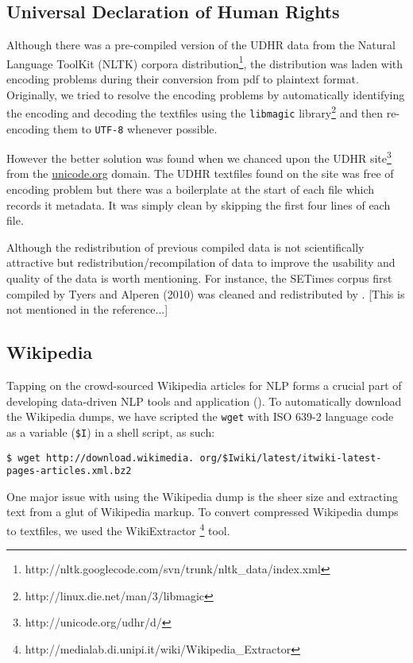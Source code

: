 \documentclass[11pt]{article}
\begin{document}
\subsection{Universal Declaration of Human Rights}

Although there was a pre-compiled version of the UDHR data from the Natural Language ToolKit (NLTK) corpora distribution\footnote{http://nltk.googlecode.com/svn/trunk/nltk\_data/index.xml}, the distribution was laden with encoding problems during their conversion from pdf to plaintext format. Originally, we tried to resolve the encoding problems by automatically identifying the encoding and decoding the textfiles using the \texttt{libmagic} library\footnote{http://linux.die.net/man/3/libmagic} and then re-encoding them to \texttt{UTF-8} whenever possible. 

However the better solution was found when we chanced upon the UDHR site\footnote{http://unicode.org/udhr/d/} from the \url{unicode.org} domain. The UDHR textfiles found on the site was free of encoding problem but there was a boilerplate at the start of each file which records it metadata. It was simply clean by skipping the first four lines of each file. 

Although the redistribution of previous compiled data is not scientifically attractive but redistribution/recompilation of data to improve the usability and quality of the data is worth mentioning. For instance, the SETimes corpus first compiled by Tyers and Alperen (2010) was cleaned and redistributed by . [This is not mentioned in the reference...]

\subsection{Wikipedia}

Tapping on the crowd-sourced Wikipedia articles for NLP forms a crucial part of developing data-driven NLP tools and application ({\color{red}{citation neeeded}}). To automatically download the Wikipedia dumps, we have scripted the \texttt{wget} with ISO 639-2 language code as a variable (\texttt{\$I}) in a shell script, as such:

\smallskip
\noindent \texttt{\$ wget http://download.wikimedia.
org/\$Iwiki/latest/itwiki-latest-
pages-articles.xml.bz2}
\medskip

\noindent One major issue with using the Wikipedia dump is the sheer size and extracting text from a glut of Wikipedia markup. To convert compressed Wikipedia dumps to textfiles, we used the WikiExtractor \footnote{http://medialab.di.unipi.it/wiki/Wikipedia\_Extractor} tool.
\end{document}

